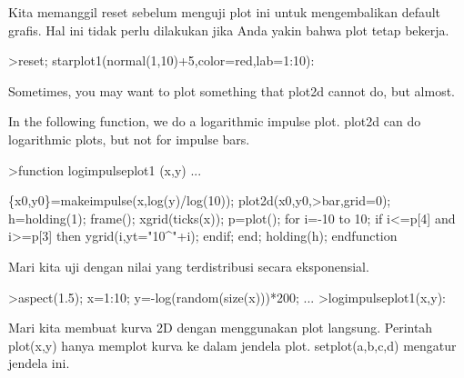 \documentclass{article}
\begin{document}
\begin{eulernotebook}
\begin{eulercomment}
\begin{eulercomment}
\begin{eulercomment}
\begin{eulercomment}
\begin{eulercomment}
\begin{eulercomment}
\begin{eulercomment}
\begin{eulercomment}
\begin{eulercomment}
\begin{eulercomment}
\begin{eulercomment}
\begin{eulercomment}
\begin{eulercomment}
Kita memanggil reset sebelum menguji plot ini untuk mengembalikan
default grafis. Hal ini tidak perlu dilakukan jika Anda yakin bahwa
plot tetap bekerja.
\end{eulercomment}
\begin{eulerprompt}
>reset; starplot1(normal(1,10)+5,color=red,lab=1:10):
\end{eulerprompt}
\begin{eulercomment}
Sometimes, you may want to plot something that plot2d cannot do, but almost.

In the following function, we do a logarithmic impulse plot. plot2d can do logarithmic
plots, but not for impulse bars.
\end{eulercomment}
\begin{eulerprompt}
>function logimpulseplot1 (x,y) ...
\end{eulerprompt}
\begin{eulerudf}
    \{x0,y0\}=makeimpulse(x,log(y)/log(10));
    plot2d(x0,y0,>bar,grid=0);
    h=holding(1);
    frame();
    xgrid(ticks(x));
    p=plot();
    for i=-10 to 10;
      if i<=p[4] and i>=p[3] then
         ygrid(i,yt="10^"+i);
      endif;
    end;
    holding(h);
  endfunction
\end{eulerudf}
\begin{eulercomment}
Mari kita uji dengan nilai yang terdistribusi secara eksponensial.
\end{eulercomment}
\begin{eulerprompt}
>aspect(1.5); x=1:10; y=-log(random(size(x)))*200; ...
>logimpulseplot1(x,y):
\end{eulerprompt}
\begin{eulercomment}
Mari kita membuat kurva 2D dengan menggunakan plot langsung. Perintah
plot(x,y) hanya memplot kurva ke dalam jendela plot. setplot(a,b,c,d)
mengatur jendela ini.


\end{eulercomment}
\end{eulercomment}
\end{eulercomment}
\end{eulercomment}
\end{eulercomment}
\end{eulercomment}
\end{eulercomment}
\end{eulercomment}
\end{eulercomment}
\end{eulercomment}
\end{eulercomment}
\end{eulercomment}
\end{eulercomment}
\end{eulernotebook}
\end{document}
